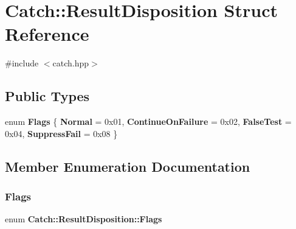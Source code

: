 \section{Catch\+::Result\+Disposition Struct Reference}
\label{struct_catch_1_1_result_disposition}


{\ttfamily \#include $<$catch.\+hpp$>$}

\subsection*{Public Types}
\begin{DoxyCompactItemize}
\item 
enum \textbf{ Flags} \{ \textbf{ Normal} = 0x01, 
\textbf{ Continue\+On\+Failure} = 0x02, 
\textbf{ False\+Test} = 0x04, 
\textbf{ Suppress\+Fail} = 0x08
 \}
\end{DoxyCompactItemize}


\subsection{Member Enumeration Documentation}
\mbox{\label{struct_catch_1_1_result_disposition_a3396cad6e2259af326b3aae93e23e9d8}} 
\subsubsection{Flags}
{\footnotesize\ttfamily enum \textbf{ Catch\+::\+Result\+Disposition\+::\+Flags}}

